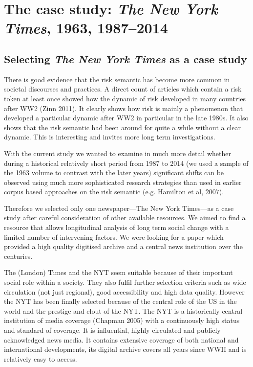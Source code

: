 
\chapter{The case study: \emph{The New York Times}, 1963, 1987--2014}

\section{Selecting \emph{The New York Times} as a case study}

There is good evidence that the risk semantic has become more common in societal discourses and practices. A direct count of articles which contain a risk token at least once showed how the dynamic of risk developed in many countries after WW2 (Zinn 2011). It clearly shows how risk is mainly a phenomenon that developed a particular dynamic after WW2 in particular in the late 1980s. It also shows that the risk semantic had been around for quite a while without a clear dynamic. This is interesting and invites more long term investigations.

With the current study we wanted to examine in much more detail whether during a historical relatively short period from 1987 to 2014 (we used a sample of the 1963 volume to contrast with the later years) significant shifts can be observed using much more sophisticated research strategies than used in earlier corpus based approaches on the risk semantic (e.g. Hamilton et al, 2007).

Therefore we selected only one newspaper---The New York Times---as a case study after careful consideration of other available resources. We aimed to find a resource that allows longitudinal analysis of long term social change with a limited number of intervening factors. We were looking for a paper which provided a high quality digitised archive and a central news institution over the centuries.

The (London) Times and the NYT seem suitable because of their important social role within a society. They also fulfil further selection criteria such as wide circulation (not just regional), good accessibility and high data quality. However the NYT has been finally selected because of the central role of the US in the world and the prestige and clout of the NYT. The NYT is a historically central institution of media coverage (Chapman 2005) with a continuously high status and standard of coverage. It is influential, highly circulated and publicly acknowledged news media. It contains extensive coverage of both national and international developments, its digital archive covers all years since WWII and is relatively easy to access.


